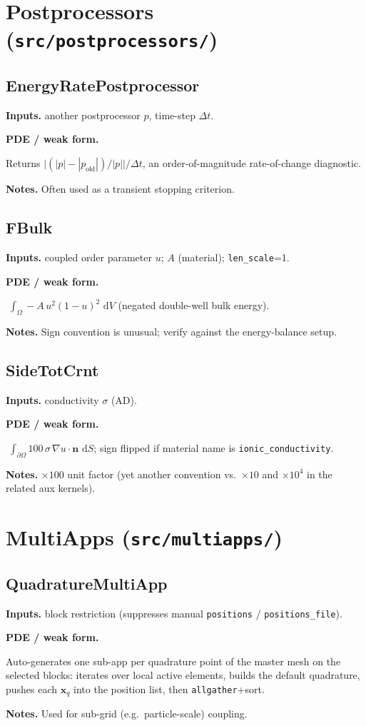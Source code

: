 \documentclass[11pt]{article}
\newcommand{\dV}{\,\mathrm{d}V}
\newcommand{\dS}{\,\mathrm{d}S}
\newcommand{\nvec}{\mathbf{n}}
\newenvironment{ecmEntry}[1]{%
  \subsection{#1}%
}{}
\newcommand{\inputsRow}[1]{\par\noindent\textbf{Inputs.} #1\par}
\newcommand{\pdeRow}[1]{\par\noindent\textbf{PDE / weak form.}\par #1\par}
\newcommand{\notesRow}[1]{\par\noindent\textbf{Notes.} #1\par}
\begin{document}
\section{Postprocessors (\texttt{src/postprocessors/})}

\begin{ecmEntry}{EnergyRatePostprocessor}
\inputsRow{another postprocessor $p$, time-step $\Delta t$.}
\pdeRow{Returns $\bigl|(|p| - |p_{\text{old}}|)/|p|\bigr|/\Delta t$, an order-of-magnitude
rate-of-change diagnostic.}
\notesRow{Often used as a transient stopping criterion.}
\end{ecmEntry}

\begin{ecmEntry}{FBulk}
\inputsRow{coupled order parameter $u$; $A$ (material); \texttt{len\_scale}=1.}
\pdeRow{$\;\int_\Omega -A\,u^2(1-u)^2\,\dV$ (negated double-well bulk energy).}
\notesRow{Sign convention is unusual; verify against the energy-balance setup.}
\end{ecmEntry}

\begin{ecmEntry}{SideTotCrnt}
\inputsRow{conductivity $\sigma$ (AD).}
\pdeRow{$\;\int_{\partial\Omega} 100\,\sigma\,\nabla u\!\cdot\!\nvec\,\dS$;
sign flipped if material name is \texttt{ionic\_conductivity}.}
\notesRow{$\times 100$ unit factor (yet another convention vs.\ $\times 10$ and $\times 10^4$
in the related aux kernels).}
\end{ecmEntry}

\section{MultiApps (\texttt{src/multiapps/})}

\begin{ecmEntry}{QuadratureMultiApp}
\inputsRow{block restriction (suppresses manual \texttt{positions} / \texttt{positions\_file}).}
\pdeRow{Auto-generates one sub-app per quadrature point of the master mesh on the selected
blocks: iterates over local active elements, builds the default quadrature, pushes each
$\bm{x}_q$ into the position list, then \texttt{allgather}+sort.}
\notesRow{Used for sub-grid (e.g.\ particle-scale) coupling.}
\end{ecmEntry}
\end{document}
